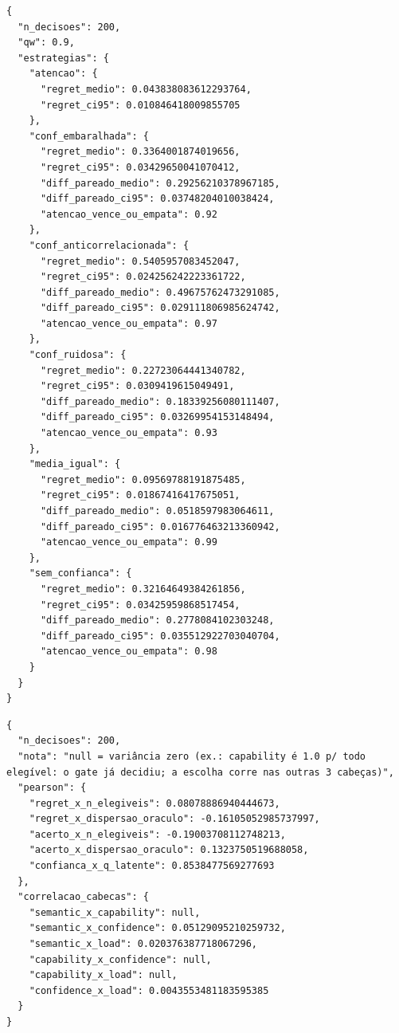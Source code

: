 \documentclass[12pt,openany,oneside,a4paper,brazil,chapter=TITLE]{abntex2}
\begin{document}
\begin{lstlisting}
{
  "n_decisoes": 200,
  "qw": 0.9,
  "estrategias": {
    "atencao": {
      "regret_medio": 0.043838083612293764,
      "regret_ci95": 0.010846418009855705
    },
    "conf_embaralhada": {
      "regret_medio": 0.3364001874019656,
      "regret_ci95": 0.03429650041070412,
      "diff_pareado_medio": 0.29256210378967185,
      "diff_pareado_ci95": 0.03748204010038424,
      "atencao_vence_ou_empata": 0.92
    },
    "conf_anticorrelacionada": {
      "regret_medio": 0.5405957083452047,
      "regret_ci95": 0.024256242223361722,
      "diff_pareado_medio": 0.49675762473291085,
      "diff_pareado_ci95": 0.029111806985624742,
      "atencao_vence_ou_empata": 0.97
    },
    "conf_ruidosa": {
      "regret_medio": 0.22723064441340782,
      "regret_ci95": 0.0309419615049491,
      "diff_pareado_medio": 0.18339256080111407,
      "diff_pareado_ci95": 0.03269954153148494,
      "atencao_vence_ou_empata": 0.93
    },
    "media_igual": {
      "regret_medio": 0.09569788191875485,
      "regret_ci95": 0.01867416417675051,
      "diff_pareado_medio": 0.0518597983064611,
      "diff_pareado_ci95": 0.016776463213360942,
      "atencao_vence_ou_empata": 0.99
    },
    "sem_confianca": {
      "regret_medio": 0.32164649384261856,
      "regret_ci95": 0.03425959868517454,
      "diff_pareado_medio": 0.2778084102303248,
      "diff_pareado_ci95": 0.035512922703040704,
      "atencao_vence_ou_empata": 0.98
    }
  }
}
\end{lstlisting}


\begin{lstlisting}
{
  "n_decisoes": 200,
  "nota": "null = variância zero (ex.: capability é 1.0 p/ todo elegível: o gate já decidiu; a escolha corre nas outras 3 cabeças)",
  "pearson": {
    "regret_x_n_elegiveis": 0.08078886940444673,
    "regret_x_dispersao_oraculo": -0.16105052985737997,
    "acerto_x_n_elegiveis": -0.19003708112748213,
    "acerto_x_dispersao_oraculo": 0.1323750519688058,
    "confianca_x_q_latente": 0.8538477569277693
  },
  "correlacao_cabecas": {
    "semantic_x_capability": null,
    "semantic_x_confidence": 0.05129095210259732,
    "semantic_x_load": 0.020376387718067296,
    "capability_x_confidence": null,
    "capability_x_load": null,
    "confidence_x_load": 0.0043553481183595385
  }
}
\end{lstlisting}
\end{document}
